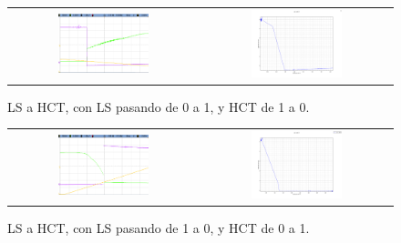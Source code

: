 \begin{figure}[H]
    \centering
    \begin{tabular}{c c}
        \includegraphics[width=0.5\textwidth]{../EJ2/Recursos/scope_38} &
        \includegraphics[width=0.5\textwidth]{../EJ2/Recursos/LS_L_v_HCT_H}
    \end{tabular}
    \caption{LS a HCT, con LS pasando de 0 a 1, y HCT de 1 a 0.}
    \label{fig:LS_L_v_HCT_H_ex5}
\end{figure}
\begin{figure}[H]
    \centering
    \begin{tabular}{c c}
        \includegraphics[width=0.5\textwidth]{../EJ2/Recursos/scope_35} &
        \includegraphics[width=0.5\textwidth]{../EJ2/Recursos/LS_H_v_HCT_L}
    \end{tabular}
    \caption{LS a HCT, con LS pasando de 1 a 0, y HCT de 0 a 1.}
    \label{fig:LS_H_v_HCT_L_ex5}
\end{figure}

